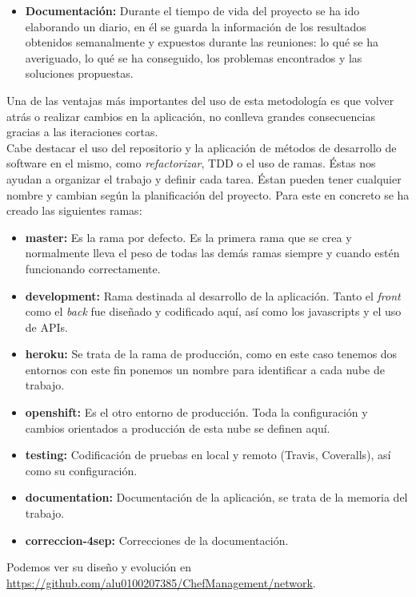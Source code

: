 \begin{itemize}
	\item \textbf{Documentación:} Durante el tiempo de vida del proyecto se ha ido elaborando un diario, en él se guarda la información de los resultados obtenidos semanalmente y expuestos durante las reuniones: lo qué se ha averiguado, lo qué se ha conseguido, los problemas encontrados y las soluciones propuestas.
\end{itemize}

Una de las ventajas más importantes del uso de esta metodología es que volver atrás o realizar cambios en la aplicación, no conlleva grandes consecuencias gracias a las iteraciones cortas. \\

Cabe destacar el uso del repositorio y la aplicación de métodos de desarrollo de software en el mismo, como \emph{refactorizar}, TDD o el uso de ramas. Éstas nos ayudan a organizar el trabajo y definir cada tarea. Éstan pueden tener cualquier nombre y cambian según la planificación del proyecto. Para este en concreto se ha creado las siguientes ramas:
\begin{itemize}
	\item \textbf{master:} Es la rama por defecto. Es la primera rama que se crea y normalmente lleva el peso de todas las demás ramas siempre y cuando estén funcionando correctamente.
	\item \textbf{development:} Rama destinada al desarrollo de la aplicación. Tanto el \emph{front} como el \emph{back} fue diseñado y codificado aquí, así como los javascripts y el uso de APIs.
	\item \textbf{heroku:} Se trata de la rama de producción, como en este caso tenemos dos entornos con este fin ponemos un nombre para identificar a cada nube de trabajo.
	\item \textbf{openshift:} Es el otro entorno de producción. Toda la configuración y cambios orientados a producción de esta nube se definen aquí.
	\item \textbf{testing:} Codificación de pruebas en local y remoto (Travis, Coveralls), así como su configuración.
	\item \textbf{documentation:} Documentación de la aplicación, se trata de la memoria del trabajo.
	\item \textbf{correccion-4sep:} Correcciones de la documentación.
\end{itemize}

Podemos ver su diseño y evolución en \href{https://github.com/alu0100207385/ChefManagement/network}{https://github.com/alu0100207385/ChefManagement/network}.



